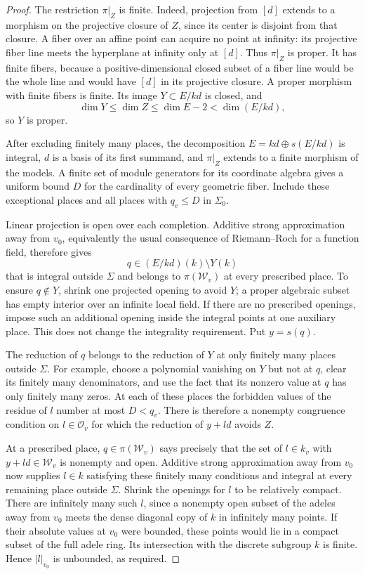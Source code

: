 \begin{proof}
The restriction $\pi|_Z$ is finite.  Indeed, projection from $[d]$
extends to a morphism on the projective closure of $Z$, since its
center is disjoint from that closure.  A fiber over an affine point
can acquire no point at infinity: its projective fiber line meets
the hyperplane at infinity only at $[d]$.  Thus $\pi|_Z$ is proper.
It has finite fibers, because a positive-dimensional closed subset
of a fiber line would be the whole line and would have $[d]$ in its
projective closure.  A proper morphism with finite fibers is finite.
Its image $Y\subset E/kd$ is closed, and
\[
 \dim Y\leq \dim Z\leq \dim E-2<\dim(E/kd),
\]
so $Y$ is proper.

After excluding finitely many places, the decomposition
$E=kd\oplus s(E/kd)$ is integral, $d$ is a basis of its first
summand, and $\pi|_Z$ extends to a finite morphism of the models.
A finite set of module generators for its coordinate algebra gives
a uniform bound $D$ for the cardinality of every geometric fiber.
Include these exceptional places and all places with $q_v\leq D$
in $\Sigma_0$.

Linear projection is open over each completion.  Additive strong
approximation away from $v_0$, equivalently the usual consequence
of Riemann--Roch for a function field, therefore gives
\[
 q\in (E/kd)(k)\setminus Y(k)
\]
that is integral outside $\Sigma$ and belongs to
$\pi(\mathcal W_v)$ at every prescribed place.  To ensure
$q\notin Y$, shrink one projected opening to avoid $Y$; a proper
algebraic subset has empty interior over an infinite local field.
If there are no prescribed openings, impose such an additional
opening inside the integral points at one auxiliary place.  This
does not change the integrality requirement.  Put $y=s(q)$.

The reduction of $q$ belongs to the reduction of $Y$ at only
finitely many places outside $\Sigma$.  For example, choose a
polynomial vanishing on $Y$ but not at $q$, clear its finitely many
denominators, and use the fact that its nonzero value at $q$ has
only finitely many zeros.  At each of these places the forbidden
values of the residue of $l$ number at most $D<q_v$.  There is
therefore a nonempty congruence condition on $l\in\mathcal O_v$
for which the reduction of $y+ld$ avoids $Z$.

At a prescribed place, $q\in\pi(\mathcal W_v)$ says precisely
that the set of $l\in k_v$ with $y+ld\in\mathcal W_v$ is
nonempty and open.  Additive strong approximation away from $v_0$
now supplies $l\in k$ satisfying these finitely many conditions
and integral at every remaining place outside $\Sigma$.
Shrink the openings for $l$ to be relatively compact.
There are infinitely many such $l$, since a nonempty open subset
of the adeles away from $v_0$ meets the dense diagonal copy of $k$
in infinitely many points.  If their absolute values at $v_0$
were bounded, these points would lie in a compact subset of the
full adele ring.  Its intersection with the discrete subgroup $k$
is finite.  Hence $|l|_{v_0}$ is unbounded, as required.
\end{proof}

